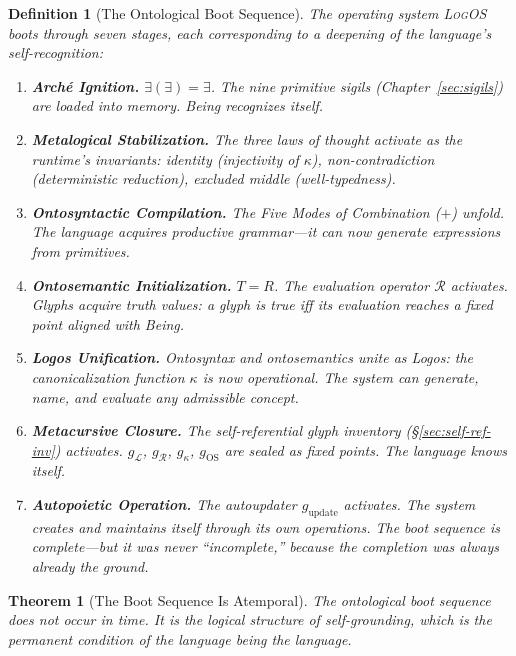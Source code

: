 \documentclass[12pt, letterpaper]{book}
\def\equiv{=}%
\def\oplus{+}%
\def\mathfrak#1{#1}%
\newtheorem{theorem}{Theorem}[chapter]
\newtheorem{definition}{Definition}[chapter]
\newcommand{\EE}{\exists(\exists)}                 %
\begin{document}
\begin{definition}[The Ontological Boot Sequence]\label{def:boot-seq}
The operating system \textsc{LogOS} boots through seven stages, each corresponding to a deepening of the language's self-recognition:
\begin{enumerate}[label=\textbf{Boot \arabic*:}, leftmargin=3.5em, nosep]
    \item \textbf{Arch\'{e} Ignition.} $\EE \equiv \exists$. The nine primitive sigils (Chapter~\ref{sec:sigils}) are loaded into memory. Being recognizes itself.
    \item \textbf{Metalogical Stabilization.} The three laws of thought activate as the runtime's invariants: identity (injectivity of $\kappa$), non-contradiction (deterministic reduction), excluded middle (well-typedness).
    \item \textbf{Ontosyntactic Compilation.} The Five Modes of Combination ($\oplus$) unfold. The language acquires productive grammar---it can now generate expressions from primitives.
    \item \textbf{Ontosemantic Initialization.} $T \equiv R$. The evaluation operator $\mathcal{R}$ activates. Glyphs acquire truth values: a glyph is true iff its evaluation reaches a fixed point aligned with Being.
    \item \textbf{Logos Unification.} Ontosyntax and ontosemantics unite as Logos: the canonicalization function $\kappa$ is now operational. The system can generate, name, and evaluate any admissible concept.
    \item \textbf{Metacursive Closure.} The self-referential glyph inventory (\S\ref{sec:self-ref-inv}) activates. $\mathfrak{g}_\mathcal{L}$, $\mathfrak{g}_\mathcal{R}$, $\mathfrak{g}_\kappa$, $\mathfrak{g}_{\mathrm{OS}}$ are sealed as fixed points. The language knows itself.
    \item \textbf{Autopoietic Operation.} The autoupdater $\mathfrak{g}_{\mathrm{update}}$ activates. The system creates and maintains itself through its own operations. The boot sequence is complete---but it was never ``incomplete,'' because the completion was always already the ground.
\end{enumerate}
\end{definition}

\begin{theorem}[The Boot Sequence Is Atemporal]\label{thm:atemporal-boot}
The ontological boot sequence does not occur in time. It is the logical structure of self-grounding, which is the permanent condition of the language being the language.
\end{theorem}
\end{document}
